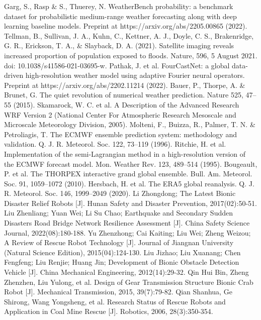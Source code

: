 \documentclass[conference]{IEEEtran}
\begin{document}
\begin{thebibliography}{00}
 Garg, S., Rasp \& S., Thuerey, N. WeatherBench probability: a benchmark dataset for probabilistic medium-range weather forecasting along with deep learning baseline models. Preprint at https://arxiv.org/abs/2205.00865 (2022).
 Tellman, B., Sullivan, J. A., Kuhn, C., Kettner, A. J., Doyle, C. S., Brakenridge, G. R., Erickson, T. A., \& Slayback, D. A. (2021). Satellite imaging reveals increased proportion of population exposed to floods. Nature, 596, 5 August 2021. doi: 10.1038/s41586-021-03695-w.
 Pathak, J. et al. FourCastNet: a global data-driven high-resolution weather model using adaptive Fourier neural operators. Preprint at https://arxiv.org/abs/2202.11214 (2022).
 Bauer, P., Thorpe, A. \& Brunet, G. The quiet revolution of numerical weather prediction. Nature 525, 47–55 (2015).
  Skamarock, W. C. et al. A Description of the Advanced Research WRF Version 2 (National Center For Atmospheric Research Mesoscale and Microscale Meteorology Division, 2005).
 Molteni, F., Buizza, R., Palmer, T. N. \& Petroliagis, T. The ECMWF ensemble prediction system: methodology and validation. Q. J. R. Meteorol. Soc. 122, 73–119 (1996).
 Ritchie, H. et al. Implementation of the semi-Lagrangian method in a high-resolution version of the ECMWF forecast model. Mon. Weather Rev. 123, 489–514 (1995).
 Bougeault, P. et al. The THORPEX interactive grand global ensemble. Bull. Am. Meteorol. Soc. 91, 1059–1072 (2010).
 Hersbach, H. et al. The ERA5 global reanalysis. Q. J. R. Meteorol. Soc. 146, 1999–2049 (2020).
 Li Zhongdong; The Latest Bionic Disaster Relief Robots [J]. Hunan Safety and Disaster Prevention, 2017(02):50-51.
 Liu Zhenliang; Yuan Wei; Li Su Chao; Earthquake and Secondary Sudden Disasters Road Bridge Network Resilience Assessment [J]. China Safety Science Journal, 2022(08):180-188.
 Yu Zhenzhong; Cai Kaiting; Liu Wei; Zheng Weizou; A Review of Rescue Robot Technology [J]. Journal of Jiangnan University (Natural Science Edition), 2015(04):124-130.
 Liu Jizhao; Liu Xuanang; Chen Fengfeng; Liu Renjie; Huang Jin; Development of Bionic Obstacle Detection Vehicle [J]. China Mechanical Engineering, 2012(14):29-32.
 Qin Hui Bin, Zheng Zhenzhen, Liu Yulong, et al. Design of Gear Transmission Structure Bionic Crab Robot [J]. Mechanical Transmission, 2015, 39(7):79-82.
 Qian Shanhua, Ge Shirong, Wang Yongsheng, et al. Research Status of Rescue Robots and Application in Coal Mine Rescue [J]. Robotics, 2006, 28(3):350-354.

\end{thebibliography}
\end{document}
